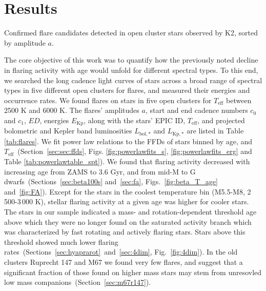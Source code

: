 \documentclass{aa}
\begin{document}
\section{Results}
\label{sec:results}
\begin{table}
\caption{Confirmed flare candidates detected in open cluster stars observed by K2, sorted by amplitude $a$.}
\label{tab:flares}
\centering
\footnotesize

\end{table}


The core objective of this work was to quantify how the previously noted decline in flaring activity with age would unfold for different spectral types. To this end, we searched the long cadence light curves of stars across a broad range of spectral types in five different open clusters for flares, and measured their energies and occurrence rates. We found \unskip\;flares on \unskip\;stars in five open clusters for $T_\mathrm{eff}$ between 2500 K and 6000 K. The flares' amplitudes $a$, start and end cadence numbers $c_0$ and $c_1$, $ED$, energies $E_\mathrm{Kp}$, along with the stars' EPIC ID, $T_\mathrm{eff}$, and projected bolometric and Kepler band luminosities $L_\mathrm{bol,*}$ and $L_\mathrm{Kp,*}$ are listed in Table \ref{tab:flares}. We fit power law relations to the FFDs of stars binned by age, and $T_\mathrm{eff}$~(Section~\ref{sec:sec:ffds}, Figs. \ref{fig:powerlawfits_s}, \ref{fig:powerlawfits_erg} and Table \ref{tab:powerlawtable_spt}). We found that flaring activity decreased with increasing age from ZAMS to 3.6 Gyr, and from mid-M to G dwarfs~(Sections~\ref{sec:beta100s} and~\ref{sec:fa}, Figs.~\ref{fig:beta_T_age} and~\ref{fig:FA}). Except for the stars in the coolest temperature bin (M5.5-M8, 2\,500-3\,000 K), stellar flaring activity at a given age was higher for cooler stars. The stars in our sample indicated a mass- and rotation-dependent threshold age above which they were no longer found on the saturated activity branch which was characterized by fast rotating and actively flaring stars. Stars above this threshold showed much lower flaring rates~(Sections~\ref{sec:hyaprarot}~and~\ref{sec:4dim}, Fig.~\ref{fig:4dim}). In the old clusters Ruprecht 147 and M67 we found very few flares, and suggest that a significant fraction of those found on higher mass stars may stem from unresovled low mass companions~(Section~\ref{sec:m67r147}). 
\end{document}
